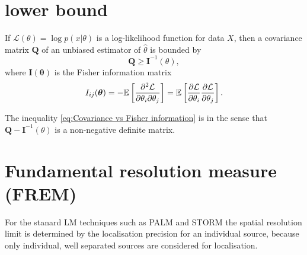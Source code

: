 
\section{\CR lower bound}

If $\mathcal{L}(\theta)=\log p(x|\theta)$ is a log-likelihood function for data $X$, then a covariance matrix $\bm{Q}$ of an unbiased estimator of $\hat{\theta}$ is bounded by \cite{Rao1945,Cover1991} 
%
\begin{equation}
	\bm{Q}\geq\bm{I}^{-1}(\theta),
	\label{eq:Covariance vs Fisher information}
\end{equation}
%
where $\bm{I}(\bm{\theta})$ is the Fisher information matrix 
%
\begin{equation}
	I_{ij}(\bm{\theta})=-\mathbb{E}\left[\frac{\partial^2\mathcal{L}}{\partial\theta_i\partial\theta_j}\right]=\mathbb{E}\left[\frac{\partial\mathcal{L}}{\partial\theta_i}\frac{\partial\mathcal{L}}{\partial\theta_j}\right].
	\label{eq:Fisher information general}
\end{equation}

The inequality \autoref{eq:Covariance vs Fisher information} is in the sense that $\bm{Q}-\bm{I}^{-1}(\theta)$ is a non-negative definite matrix.


\section{Fundamental resolution measure (FREM)}

For the stanard LM techniques such as PALM and STORM  the spatial resolution limit is determined by the localisation precision for an individual source, because only individual, well separated sources are considered for localisation. 

